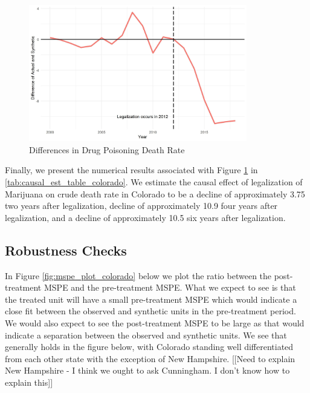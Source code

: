 \documentclass{article}
\begin{document}
\begin{figure}[H]
	\begin{center}
		\includegraphics[width=0.85\textwidth]{diffs_plot_colorado}
	\end{center}
	\caption{Differences in Drug Poisoning Death Rate}
	\label{fig:diffs_plot_colorado}
\end{figure}

Finally, we present the numerical results associated with Figure \ref{fig:diffs_plot_colorado} in \ref{tab:causal_est_table_colorado}. We estimate the causal effect of legalization of Marijuana on crude death rate in Colorado to be a decline of approximately 3.75 two years after legalization, decline of approximately 10.9 four years after legalization, and a decline of approximately 10.5 six years after legalization.



\subsection{Robustness Checks}

In Figure \ref{fig:mspe_plot_colorado} below we plot the ratio between the post-treatment MSPE and the pre-treatment MSPE. What we expect to see is that the treated unit will have a small pre-treatment MSPE which would indicate a close fit between the observed and synthetic units in the pre-treatment period. We would also expect to see the post-treatment MSPE to be large as that would indicate a separation between the observed and synthetic units. We see that generally holds in the figure below, with Colorado standing well differentiated from each other state with the exception of New Hampshire. [[Need to explain New Hampshire - I think we ought to ask Cunningham. I don't know how to explain this]]
\end{document}
